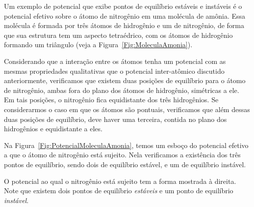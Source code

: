 Um exemplo de potencial que exibe pontos de equilíbrio estáveis e instáveis é o potencial efetivo sobre o átomo de nitrogênio em uma molécula de amônia. Essa molécula é formada por três átomos de hidrogênio e um de nitrogênio, de forma que sua estrutura tem um aspecto tetraédrico, com os átomos de hidrogênio formando um triângulo (veja a Figura~\ref{Fig:MoleculaAmonia}).

Considerando que a interação entre os átomos tenha um potencial com as mesmas propriedades qualitativas que o potencial inter-atômico discutido anteriormente, verificamos que existem duas posições de equilíbrio para o átomo de nitrogênio, ambas fora do plano dos átomos de hidrogênio, simétricas a ele. Em tais posições, o nitrogênio fica equidistante dos três hidrogênios. Se considerarmos o caso em que os átomos são pontuais, verificamos que além dessas duas posições de equilíbrio, deve haver uma terceira, contida no plano dos hidrogênios e equidistante a eles.

Na Figura~\ref{Fig:PotencialMoleculaAmonia}, temos um esboço do potencial efetivo a que o átomo de nitrogênio está sujeito. Nela verificamos a existência dos três pontos de equilíbrio, sendo dois de equilíbrio estável, e um de equilíbrio instável.

\begin{marginfigure}
\centering
{}
\caption{O potencial ao qual o nitrogênio está sujeito tem a forma mostrada à direita. Note que existem dois pontos de equilíbrio \emph{estáveis} e um ponto de equilíbrio \emph{instável}. \label{Fig:PotencialMoleculaAmonia}}
\end{marginfigure}


